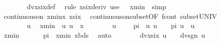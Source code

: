 \begin{isabellebody}
\ \ \ \ \ \ \isamarkupfalse%
\ dvxsix{\isacharunderscore}{\kern0pt}def\ \isamarkupfalse%
\ {\isacharparenleft}{\kern0pt}rule\ xsix{\isacharunderscore}{\kern0pt}deriv{\isacharparenright}{\kern0pt}\ {\isacharparenleft}{\kern0pt}use\ {\isacartoucheopen}{}\ {\isacharless}{\kern0pt}\ xmin{\isacartoucheclose}\ \ simp{\isacharparenright}{\kern0pt}\isanewline
\ \ \ \ \isamarkupfalse%
\ {\isachardoublequoteopen}continuous{\isacharunderscore}{\kern0pt}on\ {\isacharbraceleft}{\kern0pt}xmin{\isachardot}{\kern0pt}{\isachardot}{\kern0pt}x{\isacharbraceright}{\kern0pt}\ xsix{\isachardoublequoteclose}\ \isamarkupfalse%
\ continuous{\isacharunderscore}{\kern0pt}on{\isacharunderscore}{\kern0pt}subset{\isacharbrackleft}{\kern0pt}OF\ f{\isacharunderscore}{\kern0pt}cont\ subset{\isacharunderscore}{\kern0pt}UNIV{\isacharbrackright}{\kern0pt}\ \isakeywordONE{{\isachardot}{\kern0pt}}\isamarkupfalse%
\isanewline
\ \ \ \ \isakeywordONE{{\isacharbraceleft}{\kern0pt}}\isamarkupfalse%
\isanewline
\ \ \ \ \ \ \isamarkupfalse%
\ u\ \isamarkupfalse%
\ {\isachardoublequoteopen}xmin\ {\isacharless}{\kern0pt}\ u{\isachardoublequoteclose}\ {\isachardoublequoteopen}u\ {\isacharless}{\kern0pt}\ x{\isachardoublequoteclose}\isanewline
\ \ \ \ \ \ \isamarkupfalse%
\ u{\isacharcolon}{\kern0pt}\ {\isachardoublequoteopen}{}\ {\isacharslash}{\kern0pt}\ {\isacharparenleft}{\kern0pt}{}\ {\isacharasterisk}{\kern0pt}\ pi{\isacharparenright}{\kern0pt}\ {\isacharless}{\kern0pt}\ u{\isachardoublequoteclose}\ {\isachardoublequoteopen}u\ {\isacharless}{\kern0pt}\ {}\ {\isacharslash}{\kern0pt}\ pi{\isachardoublequoteclose}\ {\isachardoublequoteopen}u{\isasymnoteq}\ {}{\isachardoublequoteclose}\ {\isachardoublequoteopen}u\ {\isachargreater}{\kern0pt}\ {}{\isachardoublequoteclose}\isanewline
\ \ \ \ \ \ \ \ \isamarkupfalse%
\ {\isacartoucheopen}xmin\ {\isachargreater}{\kern0pt}\ {}{\isacartoucheclose}\ {\isacartoucheopen}{}\ {\isacharslash}{\kern0pt}\ {\isacharparenleft}{\kern0pt}{}\ {\isacharasterisk}{\kern0pt}\ pi{\isacharparenright}{\kern0pt}\ {\isacharless}{\kern0pt}\ xmin{\isacartoucheclose}\ xbds{\isacharparenleft}{\kern0pt}{}{\isacharparenright}{\kern0pt}\ \isamarkupfalse%
\ auto\isanewline
\isanewline
\ \ \ \ \ \ \isamarkupfalse%
\ {\isachardoublequoteopen}dvxsix\ u\ {\isachargreater}{\kern0pt}\ {}\ {\isasymlongleftrightarrow}\ dvsgn\ {\isacharparenleft}{\kern0pt}{}{\isacharslash}{\kern0pt}u{\isacharparenright}{\kern0pt}\ {\isacharless}{\kern0pt}\ {}{\isachardoublequoteclose}\isanewline

\end{isabellebody}
